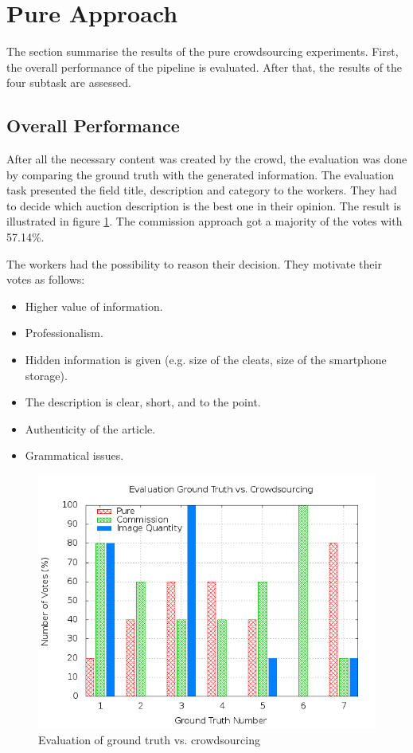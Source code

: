 \section{Pure Approach}
The section summarise the results of the pure crowdsourcing experiments. First, the overall performance of the pipeline is evaluated. After that, the results of the four subtask are assessed.
\subsection{Overall Performance}
After all the necessary content was created by the crowd, the evaluation was done by comparing the ground truth with the generated information. The evaluation task presented the field title, description and category to the workers. They had to decide which auction description is the best one in their opinion. The result is illustrated in figure \ref{crowdsourcing_eval}. The commission approach got a majority of the votes with 57.14\%.

The workers had the possibility to reason their decision. They motivate their votes as follows: 
\begin{itemize}
	\item Higher value of information. 
	\item Professionalism. 
	\item Hidden information is given (e.g. size of the cleats, size of the smartphone storage). 
	\item The description is clear, short, and to the point. 
	\item Authenticity of the article. 
	\item Grammatical issues. 
\end{itemize}
\begin{figure}
\centering
\includegraphics[scale=0.55]{images/plots/crowdsourcing/plot_evaluation_all.png}
\caption{Evaluation of ground truth vs. crowdsourcing}
\label{crowdsourcing_eval}
\end{figure}
